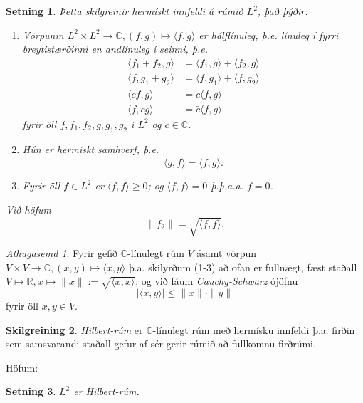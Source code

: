 \documentclass[a4paper,icelandic,11pt]{book}
\theoremstyle{plain}      \newtheorem{setn}{Setning}[chapter]
\theoremstyle{definition} \newtheorem{skilgr}[setn]{Skilgreining}
\theoremstyle{remark}     \newtheorem*{ath}{Athugasemd}
\newcommand{\R}{\mathbb R}
\newcommand{\C}{\mathbb C}
\begin{document}
\begin{setn}
  Þetta skilgreinir \emph{hermískt innfeldi} á
  rúmið $L^{2}$, það þýðir:
  \begin{enumerate}[(1)]
  \item Vörpunin $L^{2}\times L^{2}\to\C,(f,g)\mapsto\langle
    f,g\rangle$ er \emph{hálflínuleg}, þ.e. línuleg í fyrri
    breytistærðinni en andlínuleg í seinni, þ.e.
    \begin{align*}
      \langle f_{1} + f_{2},g\rangle
      &= \langle f_{1}, g\rangle + \langle f_{2},g\rangle
      \\
      \langle f, g_{1}+g_{2}\rangle
      &= \langle f,g_{1}\rangle + \langle f,g_{2}\rangle
      \\
      \langle cf,g\rangle
      &= c\langle f,g\rangle
      \\
      \langle f,cg\rangle
      &= \bar c\langle f,g\rangle
    \end{align*}
    fyrir öll $f,f_{1},f_{2},g,g_{1},g_{2}$ í $L^{2}$ og $c\in\C$.
  \item Hún er \emph{hermískt samhverf}, þ.e.
    \[
    \langle g,f \rangle = \overline{\langle f,g\rangle}.
    \]

  \item Fyrir öll $f\in L^{2}$ er $\langle f,f\rangle\ge 0$; og
    $\langle f,f\rangle=0$ þ.þ.a.a. $f=0$.
  \end{enumerate}
  Við höfum
  \[
  \| f_{2}\| = \sqrt{\langle f,f\rangle}.
  \]
\end{setn}
\begin{ath}
  Fyrir gefið $\C$-línulegt rúm $V$ ásamt vörpun $V\times V\to\C,
  (x,y)\mapsto\langle x,y\rangle$ þ.a. skilyrðum (1-3) að ofan er
  fullnægt, fæst staðall $V\mapsto\R,x\mapsto\|x\|:=\sqrt{\langle
    x,x\rangle}$; og við fáum \emph{Cauchy-Schwarz} ójöfnu
  \[
  |\langle x,y\rangle| \le\|x\|\cdot \|y\|
  \]
  fyrir öll $x,y\in V$.
\end{ath}
\begin{skilgr}
  \emph{Hilbert-rúm} er $\C$-línulegt
  rúm með hermísku innfeldi þ.a. firðin sem samsvarandi staðall gefur
  af sér gerir rúmið að fullkomnu firðrúmi.
\end{skilgr}
Höfum:
\begin{setn}
  $L^2$ er Hilbert-rúm.
\end{setn}
\end{document}
